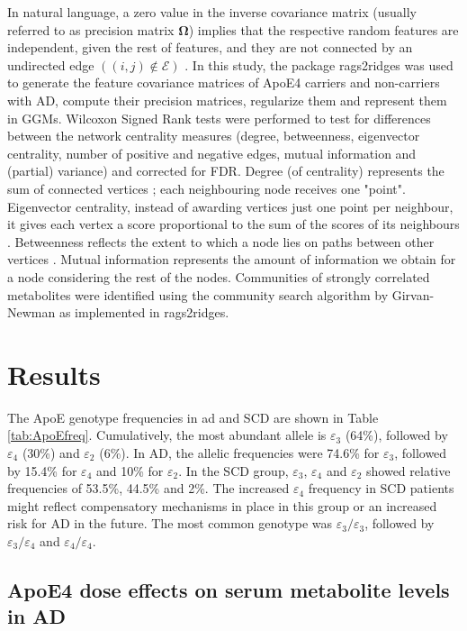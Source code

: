 \documentclass{amsart}
\begin{document}
In natural language, a zero value in the inverse covariance matrix (usually referred to as precision matrix $\mathbf{\Omega}$) implies that the respective random features are independent, given the rest of features, and they are not connected by an undirected edge $((i, j) \notin \mathcal{E})$ \cite{Peeters2022Rags2ridges:Matrices}. In this study, the package \textsf{rags2ridges} \cite{Peeters2022Rags2ridges:Matrices} was used to generate the feature covariance matrices of ApoE4 carriers and non-carriers with AD, compute their precision matrices, regularize them and represent them in GGMs. Wilcoxon Signed Rank tests were performed to test for differences between the network centrality measures (degree, betweenness, eigenvector centrality, number of positive and negative edges, mutual information and (partial) variance) and corrected for FDR. Degree (of centrality) represents  the sum of connected vertices \cite{newman2010Networks}; each neighbouring node receives one "point".  Eigenvector centrality, instead of awarding vertices just one point per neighbour, it gives each vertex a score proportional to the sum of the scores of its neighbours \cite{newman2010Networks}. Betweenness reflects the extent to which a node lies on paths between other vertices \cite{newman2010Networks}. Mutual information represents the amount of information we obtain for a node considering the rest of the nodes.  Communities of strongly correlated metabolites were identified using the community search algorithm by Girvan-Newman \cite{PhysRevE.69.026113} as implemented in \textsf{rags2ridges}. \clearpage
\section{Results} \label{results}
The ApoE genotype frequencies in \acrshort{ad} and SCD are shown in Table \ref{tab:ApoEfreq}. Cumulatively, the most abundant allele is $\varepsilon_3$ (64\%), followed by $\varepsilon_4$ (30\%) and $\varepsilon_2$ (6\%). In AD, the allelic frequencies were 74.6\% for $\varepsilon_3$, followed by 15.4\% for $\varepsilon_4$ and 10\% for $\varepsilon_2$. In the SCD group, $\varepsilon_3$, $\varepsilon_4$ and $\varepsilon_2$ showed relative frequencies of 53.5\%, 44.5\% and 2\%. The increased $\varepsilon_4$ frequency in SCD patients might reflect compensatory mechanisms in place in this group or an increased risk for AD in the future. The most common genotype was $\varepsilon_3/\varepsilon_3$, followed by $\varepsilon_3/\varepsilon_4$ and $\varepsilon_4/\varepsilon_4$.
\subsection{ApoE4 dose effects on serum metabolite levels in AD}
\end{document}
